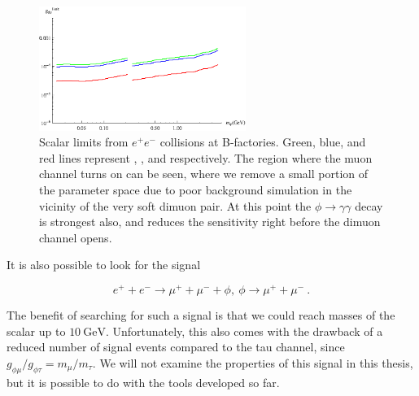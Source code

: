 \begin{figure}[h]
    \centering
    \includegraphics[width=0.6\textwidth]{Figures/limits/ee_all}
    \caption{Scalar limits from $e^+ e^-$ collisions at B-factories. Green, blue, and red lines represent \babar, \belle, and \belletwo respectively. The region where the muon channel turns on can be seen, where we remove a small portion of the parameter space due to poor background simulation in the vicinity of the very soft dimuon pair. At this point the $\phi \rightarrow \gamma \gamma$ decay is strongest also, and reduces the sensitivity right before the dimuon channel opens.}
    \label{fig:ee_limits}
\end{figure}

It is also possible to look for the signal

\begin{equation}
    e^+ + e^- \rightarrow \mu^+ + \mu^- + \phi,~\phi \rightarrow \mu^+ + \mu^-~\textrm{.}
\end{equation}

\noindent The benefit of searching for such a signal is that we could reach masses of the scalar up to $10~\textrm{GeV}$.
Unfortunately, this also comes with the drawback of a reduced number of signal events compared to the tau channel, since $g_{\phi\mu} / g_{\phi\tau} = m_\mu / m_\tau$.
We will not examine the properties of this signal in this thesis, but it is possible to do with the tools developed so far.
